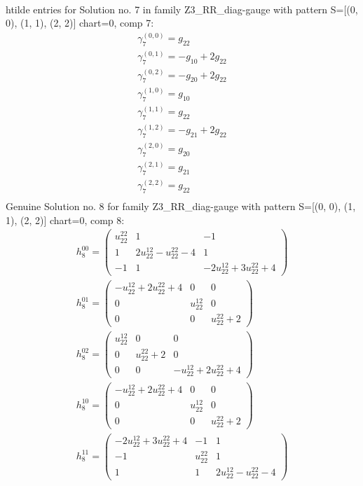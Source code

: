 \documentclass[a4paper, 11pt, twoside, onecolumn]{article}
\begin{document}
\begin{landscape}
\begin{gather*}
\end{gather*} 
htilde entries for Solution no. 7 in family Z3_RR_diag-gauge with pattern S=[(0, 0), (1, 1), (2, 2)] chart=0, comp 7: 
\begin{gather*} 
	 \gamma^{(0, 0)}_7=g_{22}\\ 
	 \gamma^{(0, 1)}_7=- g_{10} + 2 g_{22}\\ 
	 \gamma^{(0, 2)}_7=- g_{20} + 2 g_{22}\\ 
	 \gamma^{(1, 0)}_7=g_{10}\\ 
	 \gamma^{(1, 1)}_7=g_{22}\\ 
	 \gamma^{(1, 2)}_7=- g_{21} + 2 g_{22}\\ 
	 \gamma^{(2, 0)}_7=g_{20}\\ 
	 \gamma^{(2, 1)}_7=g_{21}\\ 
	 \gamma^{(2, 2)}_7=g_{22}\\ 
\end{gather*} 
Genuine Solution no. 8 for family Z3_RR_diag-gauge with pattern S=[(0, 0), (1, 1), (2, 2)] chart=0, comp 8: 
\begin{gather*} 
	 h_8^{00}=\begin{pmatrix}u^{22}_{22} & 1 & -1\\1 & 2 u^{12}_{22} - u^{22}_{22} - 4 & 1\\-1 & 1 & - 2 u^{12}_{22} + 3 u^{22}_{22} + 4\end{pmatrix}\\ 
	 h_8^{01}=\begin{pmatrix}- u^{12}_{22} + 2 u^{22}_{22} + 4 & 0 & 0\\0 & u^{12}_{22} & 0\\0 & 0 & u^{22}_{22} + 2\end{pmatrix}\\ 
	 h_8^{02}=\begin{pmatrix}u^{12}_{22} & 0 & 0\\0 & u^{22}_{22} + 2 & 0\\0 & 0 & - u^{12}_{22} + 2 u^{22}_{22} + 4\end{pmatrix}\\ 
	 h_8^{10}=\begin{pmatrix}- u^{12}_{22} + 2 u^{22}_{22} + 4 & 0 & 0\\0 & u^{12}_{22} & 0\\0 & 0 & u^{22}_{22} + 2\end{pmatrix}\\ 
	 h_8^{11}=\begin{pmatrix}- 2 u^{12}_{22} + 3 u^{22}_{22} + 4 & -1 & 1\\-1 & u^{22}_{22} & 1\\1 & 1 & 2 u^{12}_{22} - u^{22}_{22} - 4\end{pmatrix}\\ 

\end{gather*}
\end{landscape}
\end{document}
